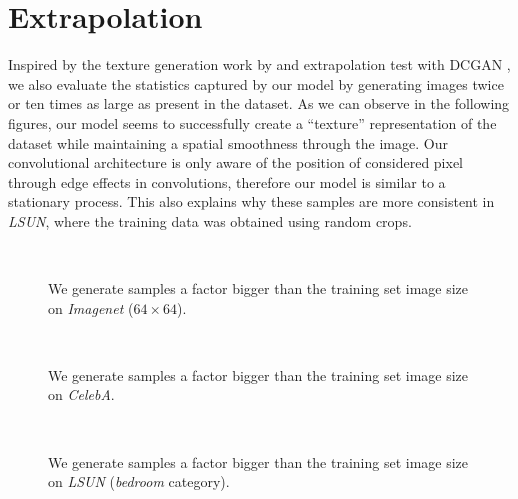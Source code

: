 \documentclass{article}
\begin{document}
\section{Extrapolation}
Inspired by the texture generation work by \citep{DBLP:conf/nips/GatysEB15,theis2015generative} and extrapolation test with DCGAN \citep{DBLP:journals/corr/RadfordMC15}, we also evaluate the statistics captured by our model by generating images twice or ten times as large as present in the dataset.
As we can observe in the following figures, our model seems to successfully create a “texture” representation of the dataset while maintaining a spatial smoothness through the image. Our convolutional architecture is only aware of the position of considered pixel through edge effects in convolutions, therefore our model is similar to a stationary process. This also explains why these samples are more consistent in \emph{LSUN}, where the training data was obtained using random crops.
\newpage

\begin{figure}[H]
\vspace{0pt}
    \centering {} \\
    \caption{We generate samples a factor bigger than the training set image size on \emph{Imagenet} ($64 \times 64$).}
\vspace{0pt}
\end{figure}

\begin{figure}[H]
\vspace{0pt}
    \centering {} \\
    \caption{We generate samples a factor bigger than the training set image size on \emph{CelebA}.}
\vspace{0pt}
\end{figure}

\begin{figure}[H]
\vspace{0pt}
    \centering {} \\
    \caption{We generate samples a factor bigger than the training set image size on \emph{LSUN} (\emph{bedroom} category).}
\vspace{0pt}
\end{figure}
\end{document}
